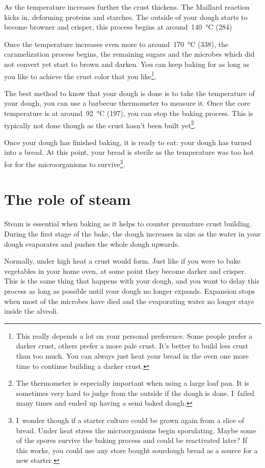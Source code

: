 As the temperature increases further the crust thickens. The Maillard reaction
kicks in, deforming proteins and starches. The outside of your dough starts to
become browner and crisper, this process begins at
around~\qty{140}{\degreeCelsius} (\qty{284}{\degF})

Once the temperature increases even more to around~\qty{170}{\degreeCelsius}
(\qty{338}{\degF}),
the caramelization process begins, the remaining sugars and the microbes which
did not convert yet start to brown and darken. You can keep baking
for as long as you like to achieve the crust color that you
like\footnote{This really depends a lot on your personal preference.
Some people prefer a darker crust, others prefer a more pale crust.
It's better to build less crust than too much. You can always just
heat your bread in the oven one more time to continue building a
darker crust.}.

The best method to know that your dough is done is to take
the temperature of your dough, you can use a barbecue thermometer
to measure it. Once the core temperature is at around~\qty{92}{\degreeCelsius}
(\qty{197}{\degF}),
you can stop the baking process. This is typically not done though
as the crust hasn't been built yet\footnote{The thermometer is
especially important when using a large loaf pan. It is sometimes
very hard to judge from the outside if the dough is done. I~failed
many times and ended up having a semi baked dough.}.

Once your dough has finished baking, it is ready to eat: your
dough has turned into a bread. At this
point, your bread is sterile as the temperature was too hot for
for the microorganisms to survive\footnote{I~wonder though
if a starter culture could be grown again from a slice of bread.
Under heat stress the microorganisms begin sporulating. Maybe
some of the spores survive the baking process and could be reactivated
later? If this works, you could use any store bought sourdough
bread as a source for a new starter.}.

\section{The role of steam}
Steam is essential when baking as it helps to counter premature
crust building. During the first stage of the bake, the dough
increases in size as the water in your dough evaporates and pushes
the whole dough upwards.

Normally, under high heat a crust would form. Just like
if you were to bake vegetables in your home oven, at some point
they become darker and crisper. This is the same thing that
happens with your dough, and you want to delay this process
as long as possible until your dough no longer expands.
Expansion stops when most of the microbes have died and
the evaporating water no longer stays inside the alveoli.

